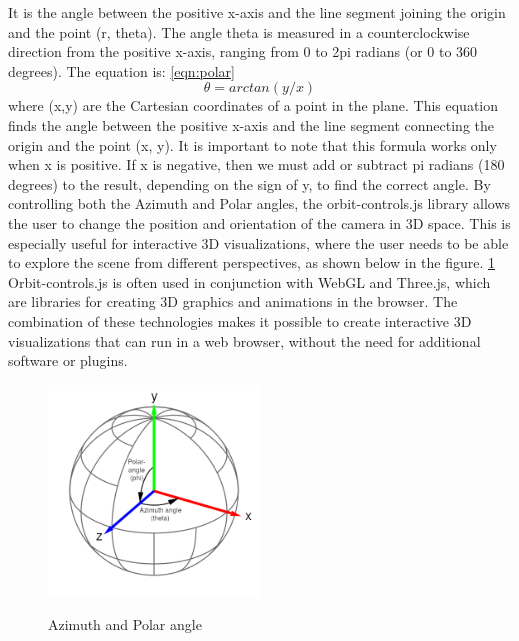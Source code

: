 It is the angle between the positive x-axis and the line segment 
joining the origin and the point (r, theta). The angle theta is measured in a counterclockwise direction 
from the positive x-axis, ranging from 0 to 2pi radians (or 0 to 360 degrees). The equation is: \ref{eqn:polar}
\begin{equation}
  \label{eqn:polar}
  \theta = arctan(y/x)
\end{equation}
where (x,y) are the Cartesian coordinates of a point in the plane. This equation finds the angle between the positive x-axis 
and the line segment connecting the origin and the point (x, y).
It is important to note that this formula works only when x is positive. If x is negative, 
then we must add or subtract pi radians (180 degrees) to the result, depending on the sign of y, to find the correct angle.
By controlling both the Azimuth and Polar angles, the orbit-controls.js library allows the user to 
change the position and orientation of the camera in 3D space. This is especially useful for interactive 
3D visualizations, where the user needs to be able to explore the scene from different perspectives, as shown below in the figure. \ref{fig:orbitcontrols}
Orbit-controls.js is often used in conjunction with WebGL and Three.js, which are libraries for creating 
3D graphics and animations in the browser. The combination of these technologies makes it possible to create 
interactive 3D visualizations that can run in a web browser, without the need for additional software or plugins.
\\
\begin{figure}[htb]
  \centering
  \includegraphics[width=0.5\textwidth]{pics/orbitcontrols.png}
  \caption{Azimuth and Polar angle}
  \cite{angles}
  \label{fig:orbitcontrols}
\end{figure}

